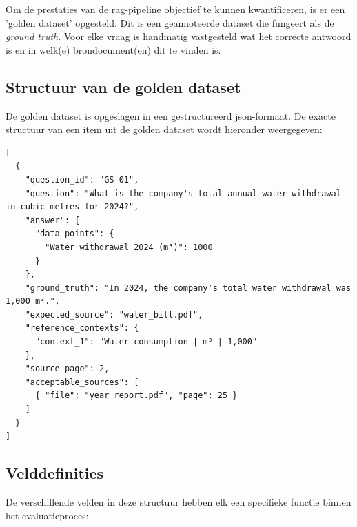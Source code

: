 Om de prestaties van de \gls{rag}-pipeline objectief te kunnen kwantificeren, is er een 'golden dataset' opgesteld. Dit is een geannoteerde dataset die fungeert als de \textit{ground truth}. Voor elke vraag is handmatig vastgesteld wat het correcte antwoord is en in welk(e) brondocument(en) dit te vinden is.

\subsection{Structuur van de golden dataset}
\label{sec:golden-dataset-structuur}

De golden dataset is opgeslagen in een gestructureerd \gls{json}-formaat. De exacte structuur van een item uit de golden dataset wordt hieronder weergegeven:

\begin{listing}[H]
\begin{verbatim}
[
  {
    "question_id": "GS-01",
    "question": "What is the company's total annual water withdrawal in cubic metres for 2024?",
    "answer": {
      "data_points": {
        "Water withdrawal 2024 (m³)": 1000
      }
    },
    "ground_truth": "In 2024, the company's total water withdrawal was 1,000 m³.",
    "expected_source": "water_bill.pdf",
    "reference_contexts": {
      "context_1": "Water consumption | m³ | 1,000"
    },
    "source_page": 2,
    "acceptable_sources": [
      { "file": "year_report.pdf", "page": 25 }
    ]
  }
]
\end{verbatim}
\caption{Exacte \gls{json}-structuur van de golden dataset}
\label{lst:goldenset-json}
\end{listing}

\subsection{Velddefinities}

De verschillende velden in deze structuur hebben elk een specifieke functie binnen het evaluatieproces:

